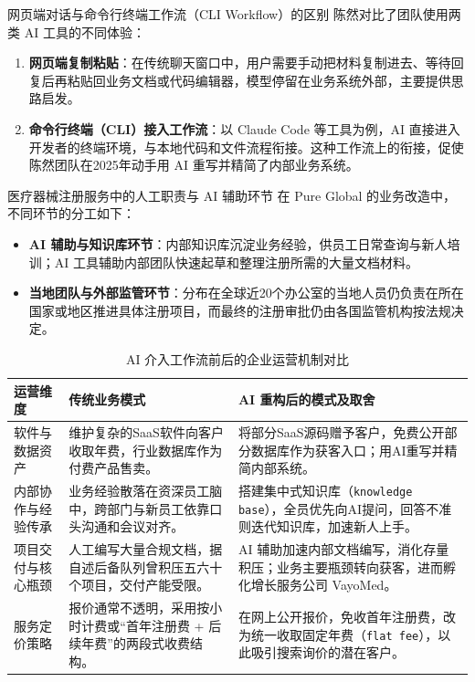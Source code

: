 \documentclass[UTF8,a4paper,11pt,fontset=fandol]{ctexart}
\begin{document}
\begin{knowledgebox}{网页端对话与命令行终端工作流（CLI Workflow）的区别}
陈然对比了团队使用两类 AI 工具的不同体验：
\begin{enumerate}
\item \textbf{网页端复制粘贴}：在传统聊天窗口中，用户需要手动把材料复制进去、等待回复后再粘贴回业务文档或代码编辑器，模型停留在业务系统外部，主要提供思路启发。
\item \textbf{命令行终端（CLI）接入工作流}：以 Claude Code 等工具为例，AI 直接进入开发者的终端环境，与本地代码和文件流程衔接。这种工作流上的衔接，促使陈然团队在2025年动手用 AI 重写并精简了内部业务系统。
\end{enumerate}
\end{knowledgebox}
\begin{importantbox}{医疗器械注册服务中的人工职责与 AI 辅助环节}
在 Pure Global 的业务改造中，不同环节的分工如下：
\begin{itemize}
\item \textbf{AI 辅助与知识库环节}：内部知识库沉淀业务经验，供员工日常查询与新人培训；AI 工具辅助内部团队快速起草和整理注册所需的大量文档材料。
\item \textbf{当地团队与外部监管环节}：分布在全球近20个办公室的当地人员仍负责在所在国家或地区推进具体注册项目，而最终的注册审批仍由各国监管机构按法规决定。
\end{itemize}
\end{importantbox}
\begin{table}[H]\centering\small
\caption{AI 介入工作流前后的企业运营机制对比}
\begin{tabular}{>{\raggedright\arraybackslash}p{\dimexpr(\linewidth-6\tabcolsep)/3\relax}>{\raggedright\arraybackslash}p{\dimexpr(\linewidth-6\tabcolsep)/3\relax}>{\raggedright\arraybackslash}p{\dimexpr(\linewidth-6\tabcolsep)/3\relax}}
\toprule
运营维度 & 传统业务模式 & AI 重构后的模式及取舍\\\midrule
软件与数据资产 & 维护复杂的SaaS软件向客户收取年费，行业数据库作为付费产品售卖。 & 将部分SaaS源码赠予客户，免费公开部分数据库作为获客入口；用AI重写并精简内部系统。\\[4pt]
内部协作与经验传承 & 业务经验散落在资深员工脑中，跨部门与新员工依靠口头沟通和会议对齐。 & 搭建集中式知识库（\texttt{knowledge base}），全员优先向AI提问，回答不准则迭代知识库，加速新人上手。\\[4pt]
项目交付与核心瓶颈 & 人工编写大量合规文档，据自述后备队列曾积压五六十个项目，交付产能受限。 & AI 辅助加速内部文档编写，消化存量积压；业务主要瓶颈转向获客，进而孵化增长服务公司 VayoMed。\\[4pt]
服务定价策略 & 报价通常不透明，采用按小时计费或“首年注册费 + 后续年费”的两段式收费结构。 & 在网上公开报价，免收首年注册费，改为统一收取固定年费（\texttt{flat fee}），以此吸引搜索询价的潜在客户。\\[4pt]
\bottomrule\end{tabular}\end{table}
\end{document}
